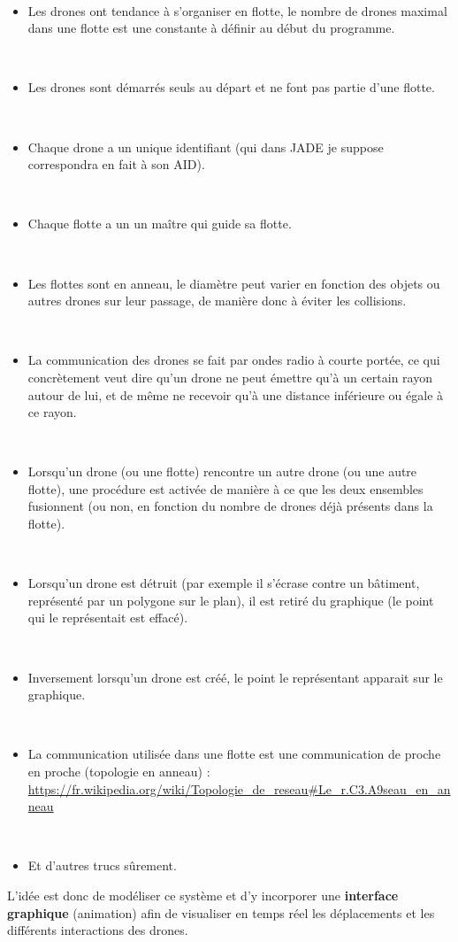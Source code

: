 \documentclass[11pt]{report}
\begin{document}
~\
\begin{itemize}
\item Les drones ont tendance à s'organiser en flotte, le nombre de drones maximal dans une flotte est une constante à définir au début du programme.

~\
\item Les drones sont démarrés seuls au départ et ne font pas partie d'une flotte.

~\
\item Chaque drone a un unique identifiant (qui dans JADE je suppose correspondra en fait à son AID).

~\
\item Chaque flotte a un un maître qui guide sa flotte.

~\
\item Les flottes sont en anneau, le diamètre peut varier en fonction des objets ou autres drones sur leur passage, de manière donc à éviter les collisions.

~\
\item La communication des drones se fait par ondes radio à courte portée, ce qui concrètement veut dire qu'un drone ne peut émettre qu'à un certain rayon autour de lui, et de même ne recevoir qu'à une distance inférieure ou égale à ce rayon.

~\
\item Lorsqu'un drone (ou une flotte) rencontre un autre drone (ou une autre flotte), une procédure est activée de manière à ce que les deux ensembles fusionnent (ou non, en fonction du nombre de drones déjà présents dans la flotte).

~\
\item Lorsqu'un drone est détruit (par exemple il s'écrase contre un bâtiment, représenté par un polygone sur le plan), il est retiré du graphique (le point qui le représentait est effacé).

~\
\item Inversement lorsqu'un drone est créé, le point le représentant apparait sur le graphique.

~\
\item La communication utilisée dans une flotte est une communication de proche en proche (topologie en anneau) : \url{https://fr.wikipedia.org/wiki/Topologie_de_reseau#Le_r.C3.A9seau_en_anneau}

~\
\item Et d'autres trucs sûrement.
\end{itemize}

\newpage
\noindent
L'idée est donc de modéliser ce système et d'y incorporer une \textbf{interface graphique} (animation) afin de visualiser en temps réel les déplacements et les différents interactions des drones.
\end{document}

